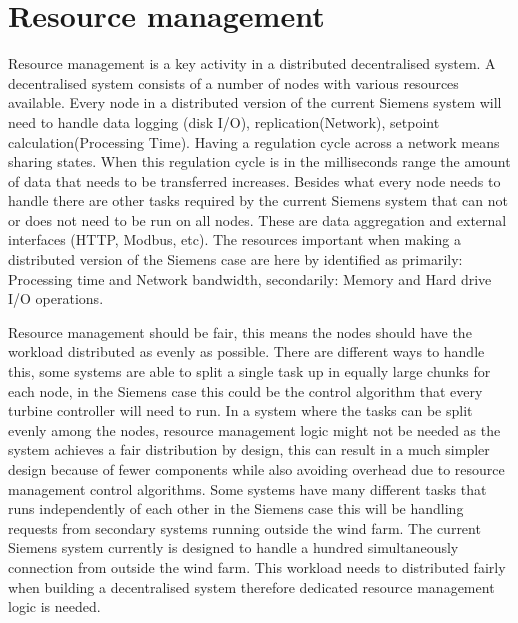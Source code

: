 \clearpage
\section{Resource management} %
\label{cha:resourceManagement}

Resource management is a key activity in a distributed decentralised system. 
A decentralised system consists of a number of nodes with various resources available.
Every node in a distributed version of the current Siemens system will need to handle data logging (disk I/O), replication(Network), setpoint calculation(Processing Time).
Having a regulation cycle across a network means sharing states. When this regulation cycle is in the milliseconds range the amount of data that needs to be transferred increases.
Besides what every node needs to handle there are other tasks required by the current Siemens system that can not or does not need to be run on all nodes. These are data aggregation and external interfaces (HTTP, Modbus, etc).
The resources important when making a distributed version of the Siemens case are here by identified as primarily: Processing time and Network bandwidth, secondarily: Memory and Hard drive I/O operations.

Resource management should be fair, this means the nodes should have the workload distributed as evenly as possible.
There are different ways to handle this, some systems are able to split a single task up in equally large chunks for each node, in the Siemens case this could be the control algorithm that every turbine controller will need to run.
In a system where the tasks can be split evenly among the nodes, resource management logic might not be needed as the system achieves a fair distribution by design, this can result in a much simpler design because of fewer components while also avoiding overhead due to resource management control algorithms.
Some systems have many different tasks that runs independently of each other in the Siemens case this will be handling requests from secondary systems running outside the wind farm.
The current Siemens system currently is designed to handle a hundred simultaneously connection from outside the wind farm. This workload needs to distributed fairly when building a decentralised system therefore dedicated resource management logic is needed.

